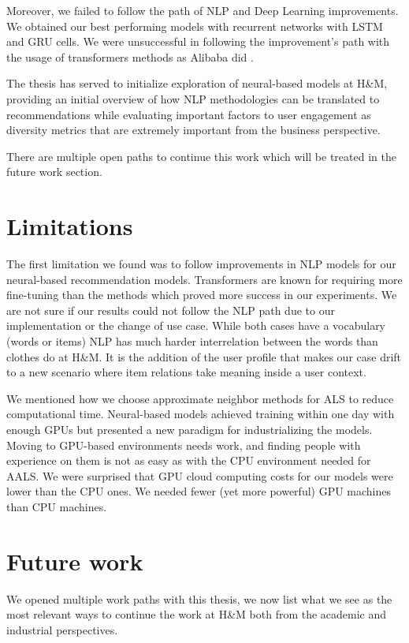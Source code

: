 \documentclass{kththesis}
\begin{document}
Moreover, we failed to follow the path of NLP and Deep Learning improvements. We obtained our best performing models with recurrent networks with LSTM and GRU cells. We were unsuccessful in following the improvement's path with the usage of transformers methods as Alibaba did \cite{alibaba, sun2019bert4rec}.

The thesis has served to initialize exploration of neural-based models at H\&M, providing an initial overview of how NLP methodologies can be translated to recommendations while evaluating important factors to user engagement as diversity metrics that are extremely important from the business perspective. 

There are multiple open paths to continue this work which will be treated in the future work section.

\section{Limitations}
The first limitation we found was to follow improvements in NLP models for our neural-based recommendation models. Transformers are known for requiring more fine-tuning than the methods which proved more success in our experiments. We are not sure if our results could not follow the NLP path due to our implementation or the change of use case. While both cases have a vocabulary (words or items) NLP has much harder interrelation between the words than clothes do at H\&M. It is the addition of the user profile that makes our case drift to a new scenario where item relations take meaning inside a user context.

We mentioned how we choose approximate neighbor methods for ALS to reduce computational time. Neural-based models achieved training within one day with enough GPUs but presented a new paradigm for industrializing the models. Moving to GPU-based environments needs work, and finding people with experience on them is not as easy as with the CPU environment needed for AALS. We were surprised that GPU cloud computing costs for our models were lower than the CPU ones. We needed fewer (yet more powerful) GPU machines than CPU machines.

\section{Future work}
We opened multiple work paths with this thesis, we now list what we see as the most relevant ways to continue the work at H\&M both from the academic and industrial perspectives.
\end{document}
